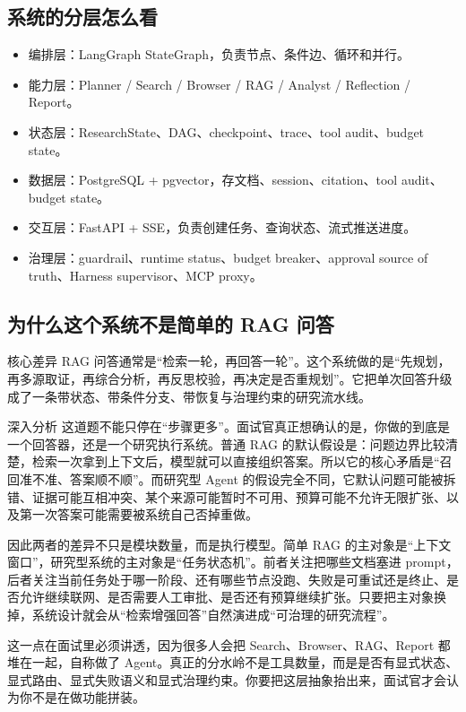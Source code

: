 \documentclass[12pt]{article}
\begin{document}
\subsection{系统的分层怎么看}
\begin{itemize}[leftmargin=2em]
  \item 编排层：LangGraph StateGraph，负责节点、条件边、循环和并行。
  \item 能力层：Planner / Search / Browser / RAG / Analyst / Reflection / Report。
  \item 状态层：ResearchState、DAG、checkpoint、trace、tool audit、budget state。
  \item 数据层：PostgreSQL + pgvector，存文档、session、citation、tool audit、budget state。
  \item 交互层：FastAPI + SSE，负责创建任务、查询状态、流式推送进度。
  \item 治理层：guardrail、runtime status、budget breaker、approval source of truth、Harness supervisor、MCP proxy。
\end{itemize}

\subsection{为什么这个系统不是简单的 RAG 问答}
\begin{qaBox}{核心差异}
RAG 问答通常是“检索一轮，再回答一轮”。这个系统做的是“先规划，再多源取证，再综合分析，再反思校验，再决定是否重规划”。它把单次回答升级成了一条带状态、带条件分支、带恢复与治理约束的研究流水线。
\end{qaBox}

\begin{analysisBox}{深入分析}
这道题不能只停在“步骤更多”。面试官真正想确认的是，你做的到底是一个回答器，还是一个研究执行系统。普通 RAG 的默认假设是：问题边界比较清楚，检索一次拿到上下文后，模型就可以直接组织答案。所以它的核心矛盾是“召回准不准、答案顺不顺”。而研究型 Agent 的假设完全不同，它默认问题可能被拆错、证据可能互相冲突、某个来源可能暂时不可用、预算可能不允许无限扩张、以及第一次答案可能需要被系统自己否掉重做。

因此两者的差异不只是模块数量，而是执行模型。简单 RAG 的主对象是“上下文窗口”，研究型系统的主对象是“任务状态机”。前者关注把哪些文档塞进 prompt，后者关注当前任务处于哪一阶段、还有哪些节点没跑、失败是可重试还是终止、是否允许继续联网、是否需要人工审批、是否还有预算继续扩张。只要把主对象换掉，系统设计就会从“检索增强回答”自然演进成“可治理的研究流程”。

这一点在面试里必须讲透，因为很多人会把 Search、Browser、RAG、Report 都堆在一起，自称做了 Agent。真正的分水岭不是工具数量，而是是否有显式状态、显式路由、显式失败语义和显式治理约束。你要把这层抽象抬出来，面试官才会认为你不是在做功能拼装。
\end{analysisBox}
\end{document}
